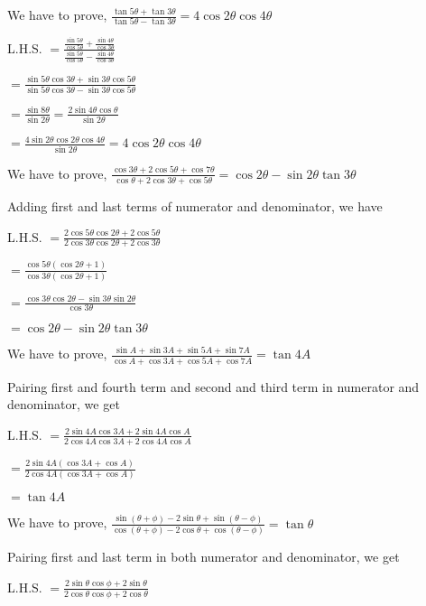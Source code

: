 \item We have to prove, $\frac{\tan 5\theta + \tan 3\theta}{\tan 5\theta - \tan 3\theta} = 4\cos 2\theta\cos 4\theta$

  L.H.S. $= \frac{\frac{\sin5\theta}{\cos5\theta} + \frac{\sin4\theta}{\cos3\theta}}{\frac{\sin5\theta}{\cos5\theta} -
    \frac{\sin4\theta}{\cos3\theta}}$

  $= \frac{\sin5\theta\cos3\theta + \sin3\theta\cos5\theta}{\sin5\theta\cos3\theta - \sin3\theta\cos5\theta}$

  $= \frac{\sin8\theta}{\sin2\theta} = \frac{2\sin4\theta\cos\theta}{\sin2\theta}$

  $= \frac{4\sin2\theta\cos2\theta\cos4\theta}{\sin2\theta} = 4\cos2\theta\cos4\theta$

\item We have to prove, $\frac{\cos 3\theta + 2\cos5\theta + \cos 7\theta}{\cos\theta + 2\cos3\theta + \cos 5\theta} = \cos 2\theta - \sin
  2\theta\tan 3\theta$

  Adding first and last terms of numerator and denominator, we have

  L.H.S. $= \frac{2\cos5\theta\cos2\theta + 2\cos5\theta}{2\cos3\theta\cos2\theta + 2\cos3\theta}$

  $= \frac{\cos5\theta(\cos2\theta + 1)}{\cos3\theta(\cos2\theta + 1)}$

  $= \frac{\cos3\theta\cos2\theta - \sin3\theta\sin2\theta}{\cos3\theta}$

  $= \cos2\theta - \sin2\theta\tan3\theta$

\item We have to prove, $\frac{\sin A + \sin 3A + \sin 5A + \sin 7A}{\cos A + \cos 3A + \cos 5A + \cos 7A} = \tan 4A$

  Pairing first and fourth term and second and third term in numerator and denominator, we get

  L.H.S. $= \frac{2\sin4A\cos3A + 2\sin4A\cos A}{2\cos4A\cos3A + 2\cos4A\cos A}$

  $= \frac{2\sin4A(\cos 3A + \cos A)}{2\cos4A(\cos 3A + \cos A)}$

  $= \tan 4A$

\item We have to prove, $\frac{\sin (\theta + \phi) - 2\sin\theta + \sin (\theta - \phi)}{\cos (\theta + \phi) - 2\cos \theta +
  \cos(\theta - \phi)} = \tan\theta$

  Pairing first and last term in both numerator and denominator, we get

  L.H.S. $= \frac{2\sin\theta\cos\phi + 2\sin\theta}{2\cos\theta\cos\phi + 2\cos\theta}$

